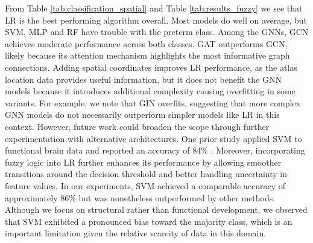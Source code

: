 \documentclass[doubleblind]{ecai}
\begin{document}
From Table \ref{tab:classification_spatial} and Table \ref{tab:results_fuzzy} we see that LR is the best performing algorithm overall. Most models do well on average, but SVM, MLP and RF have trouble with the preterm class. Among the GNNs, GCN achieves moderate performance across both classes. GAT outperforms GCN, likely because its attention mechanism highlights the most informative graph connections. Adding spatial coordinates improves LR performance, as the atlas location data provides useful information, but it does not benefit the GNN models because it introduces additional complexity causing overfitting in some variants. For example, we note that GIN overfits, suggesting that more complex GNN models do not necessarily outperform simpler models like LR in this context. However, future work could broaden the scope through further experimentation with alternative architectures. One prior study applied SVM to functional brain data and reported an accuracy of 84\% \cite{smyser2016prediction}. Moreover, incorporating fuzzy logic into LR further enhances its performance by allowing smoother transitions around the decision threshold and better handling uncertainty in feature values. In our experiments, SVM achieved a comparable accuracy of approximately 86\% but was nonetheless outperformed by other methods. Although we focus on structural rather than functional development, we observed that SVM exhibited a pronounced bias toward the majority class, which is an important limitation given the relative scarcity of data in this domain.

\end{document}
